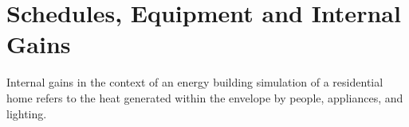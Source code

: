


 

\section{Schedules, Equipment and Internal Gains}
Internal gains in the context of an energy building simulation of a residential home refers to the heat generated within the envelope by people, appliances, and lighting.

